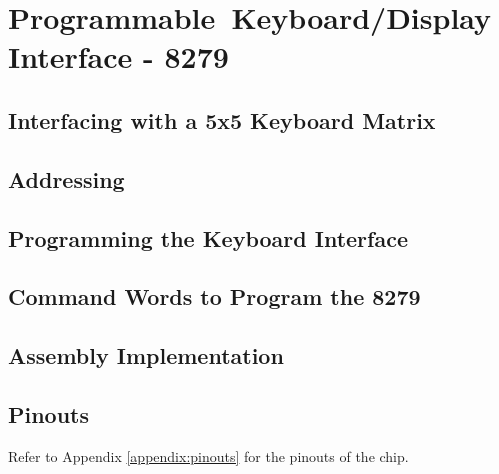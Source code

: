 \newpage
\section{Programmable Keyboard/Display Interface - 8279}

    \subsection{Interfacing with a 5x5 Keyboard Matrix}

    \subsection{Addressing}

    \subsection{Programming the Keyboard Interface}

    \subsection{Command Words to Program the 8279}

    \subsection{Assembly Implementation}

    \subsection{Pinouts}
    Refer to Appendix \ref{appendix:pinouts} for the pinouts of the chip.
